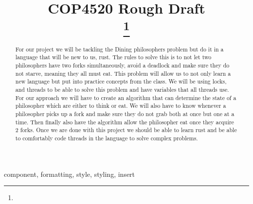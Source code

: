 \documentclass[conference]{IEEEtran}
\begin{document}
	
	\title{COP4520 Rough Draft\\
		{}
		\thanks{}
	}
	
	\author{
		
		\and
		
		\and
		\and
	}
	
	\maketitle
	
	\begin{abstract}
		For our project we will be tackling the Dining philosophers problem but do it in a language that will be new to us, rust. The rules to solve this is to not let two philosophers have two forks simultaneously, avoid a deadlock and make sure they do not starve, meaning they all must eat. This problem will allow us to not only learn a new language but put into practice concepts from the class. We will be using locks, and threads to be able to solve this problem and have variables that all threads use. For our approach we will have to create an algorithm that can determine the state of a philosopher which are either to think or eat. We will also have to know whenever a philosopher picks up a fork and make sure they do not grab both at once but one at a time. Then finally also have the algorithm allow the philosopher eat once they acquire 2 forks. Once we are done with this project we should be able to learn rust and be able to comfortably code threads in the language to solve complex problems.
	\end{abstract}
	
	\begin{IEEEkeywords}
		component, formatting, style, styling, insert
	\end{IEEEkeywords}
	
\end{document}

